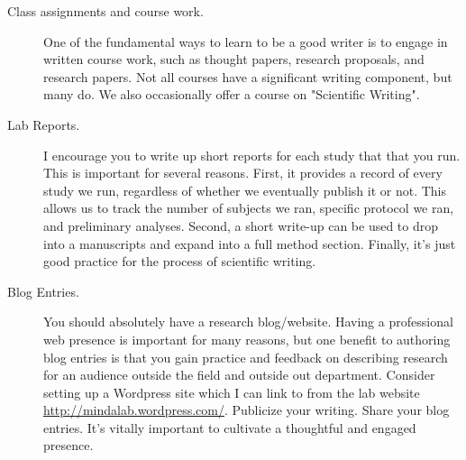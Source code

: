 \documentclass{article}
\begin{document}
\begin{description}
\item [Class assignments and course work.] 
One of the fundamental ways to learn to be a good writer is to engage in written course work, such as thought papers, research proposals, and research papers. Not all courses have a significant writing component, but many do. We also occasionally offer a course on "Scientific Writing".

\item [Lab Reports.] 
I encourage you to write up short reports for each study that that you run. This is important for several reasons. First, it provides a record of every study we run, regardless of whether we eventually publish it or not. This allows us to track the number of subjects we ran, specific protocol we ran, and preliminary analyses. Second, a short write-up can be used to drop into a manuscripts and expand into a full method section. Finally, it's just good practice for the process of scientific writing. 

\item [Blog Entries.] 
You should absolutely have a research blog/website. Having a professional web presence is important for many reasons, but one benefit to authoring blog entries is that you gain practice and feedback on describing research for an audience outside the field and outside out department. Consider setting up a Wordpress site which I can link to from the lab website \href{http://mindalab.wordpress.com}{http://mindalab.wordpress.com/}. Publicize your writing. Share your blog entries. It's vitally important to cultivate a thoughtful and engaged presence.

\end{description}
\end{document}
